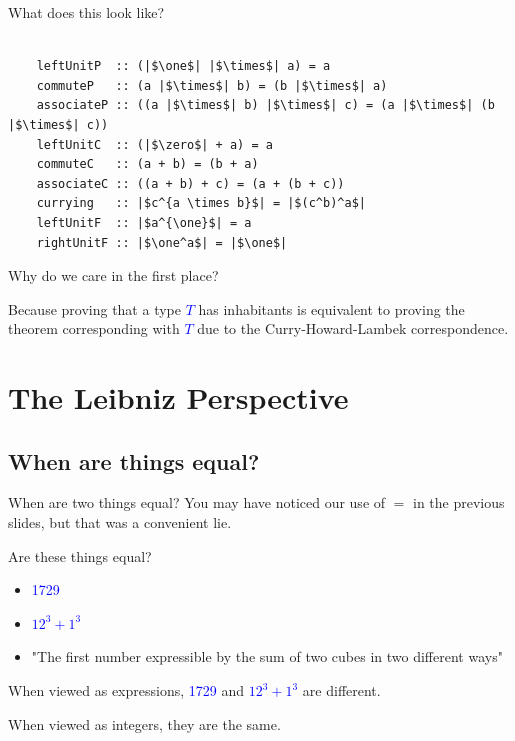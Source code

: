 \documentclass[tikz]{beamer}
\newcommand{\zero}{\bm{\mathbb{0}}}
\newcommand{\one}{\bm{\mathbb{1}}}
\newcommand{\blue}[1]{\textcolor{blue}{#1}}
\newcommand{\mblue}[1]{\textcolor{blue}{$#1$}}
\theoremstyle{definition}
\begin{document}
\begin{frame}[fragile]
	What does this look like?
	
	\begin{center}
	\begin{verbatim}
	
	leftUnitP  :: (|$\one$| |$\times$| a) = a
	commuteP   :: (a |$\times$| b) = (b |$\times$| a)
	associateP :: ((a |$\times$| b) |$\times$| c) = (a |$\times$| (b |$\times$| c))
	leftUnitC  :: (|$\zero$| + a) = a
	commuteC   :: (a + b) = (b + a)
	associateC :: ((a + b) + c) = (a + (b + c))
	currying   :: |$c^{a \times b}$| = |$(c^b)^a$|
	leftUnitF  :: |$a^{\one}$| = a
	rightUnitF :: |$\one^a$| = |$\one$|
	\end{verbatim}
	
	\end{center}
\end{frame}

\frame
{ 
	Why do we care in the first place? 
}

\frame
{ 
	Because proving that a type \mblue{T} has inhabitants is equivalent to proving the theorem corresponding with \mblue{T} due to the Curry-Howard-Lambek correspondence.
}



\section{The Leibniz Perspective}

\subsection{When are things equal?}
\frame
{
	When are two things equal? You may have noticed our use of $=$ in the previous slides, but that was a convenient lie.
}

\frame
{
	Are these things equal? 
	
	\begin{itemize}
		\item \blue{1729}
		\item \mblue{12^3 + 1^3}
		\item "The first number expressible by the sum of two cubes in two different ways"
	\end{itemize}
}

\frame
{
	When viewed as expressions, \blue{1729} and \mblue{12^3 + 1^3} are different.
}

\frame
{
	When viewed as integers, they are the same. 
}
\end{document}
